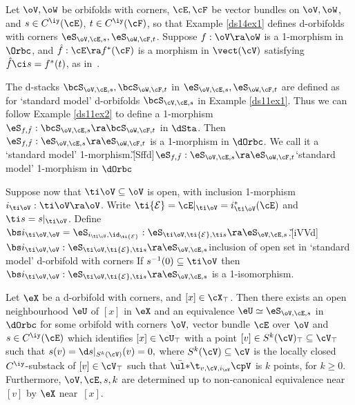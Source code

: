 \documentclass{article}
\begin{document}
\begin{ex} Let $\oV,\oW$ be orbifolds with corners, $\cE,\cF$ be
vector bundles on $\oV,\oW$, and $s\in C^\iy(\cE)$, $t\in
C^\iy(\cF)$, so that Example \ref{ds14ex1} defines d-orbifolds with
corners $\eS_{\oV,\cE,s},\eS_{\oW,\cF,t}$. Suppose $f:\oV\ra\oW$ is
a 1-morphism in $\Orbc$, and $\hat f:\cE\ra f^*(\cF)$ is a morphism
in $\vect(\cV)$ satisfying $\hat f\ci s= f^*(t)$, as
in~.

The d-stacks $\bcS_{\oV,\cE,s},\bcS_{\oW,\cF,t}$ in
$\eS_{\oV,\cE,s},\eS_{\oW,\cF,t}$ are defined as for `standard
model' d-orbifolds $\bcS_{\cV,\cE,s}$ in Example \ref{ds11ex1}. Thus
we can follow Example \ref{ds11ex2} to define a 1-morphism
$\eS_{\smash{f,\hat f}}:\bcS_{\oV,\cE,s}\ra\bcS_{\oW,\cF,t}$ in
$\dSta$. Then $\eS_{\smash{f,\hat f}}:\eS_{\oV,\cE,s}\ra
\eS_{\oW,\cF,t}$ is a 1-morphism in $\dOrbc$. We call it a
`standard model' 1-morphism.\G[Sffd]{$\eS_{\smash{f,\hat
f}}:\eS_{\oV,\cE,s}\ra \eS_{\oW,\cF,t}$}{`standard model' 1-morphism
in $\dOrbc$}

Suppose now that $\ti\oV\subseteq\oV$ is open, with inclusion
1-morphism $i_{\smash{\ti\oV}}:\ti\oV\ra\oV$. Write $\ti{\cal
E}=\cE\vert_{\smash{\ti\oV}}=i_{\smash{\ti\oV}}^*(\cE)$ and $\ti
s=s\vert_{\smash{\ti\oV}}$. Define $\bs
i_{\smash{\ti\oV,\oV}}=\eS_{i_{\smash{\ti\oV}},\id_{\ti{\cal E}}}:
\eS_{\smash{\ti\oV,\ti{\cal E},\ti s}}\ra\eS_{\oV,\cE,s}$.\G[iVVd]{$\bs
i_{\smash{\ti\oV,\oV}}:\eS_{\smash{\ti\oV,\ti{\cal E},\ti
s}}\ra\eS_{\oV,\cE,s}$}{inclusion of open set in `standard model'
d-orbifold with corners} If $s^{-1}(0)\subseteq\ti\oV$ then $\bs
i_{\smash{\ti\oV,\oV}}:\eS_{\smash{\ti\oV,\ti{\cal E},\ti
s}}\ra\eS_{\oV,\cE,s}$ is a 1-isomorphism.
\label{ds14ex2}
\end{ex}

\begin{thm} Let\/ $\eX$ be a d-orbifold with corners, and\/
$[x]\in\cX_\top$. Then there exists an open neighbourhood\/ $\eU$
of\/ $[x]$ in $\eX$ and an equivalence $\eU\simeq\eS_{\oV,\cE,s}$ in
$\dOrbc$ for some orbifold with corners\/ $\oV,$ vector bundle $\cE$
over $\oV$ and $s\in C^\iy(\cE)$ which identifies $[x]\in\cU_\top$
with a point\/ $[v]\in S^k(\cV)_\top\subseteq\cV_\top$ such that\/
$s(v)=\d s\vert_{S^k(\cV)}(v)=0,$ where $S^k(\cV)\subseteq\cV$ is
the locally closed\/ $C^\iy$-substack of\/ $[v]\in\cV_\top$ such
that\/ $\bar{\ul *}\t_{v,\cV,i_\oV}\cpV$ is $k$ points, for $k\ge
0$. Furthermore, $\oV,\cE,s,k$ are determined up to non-canonical
equivalence near $[v]$ by $\eX$ near~$[x]$.
\label{ds14thm1}
\end{thm}
\end{document}
